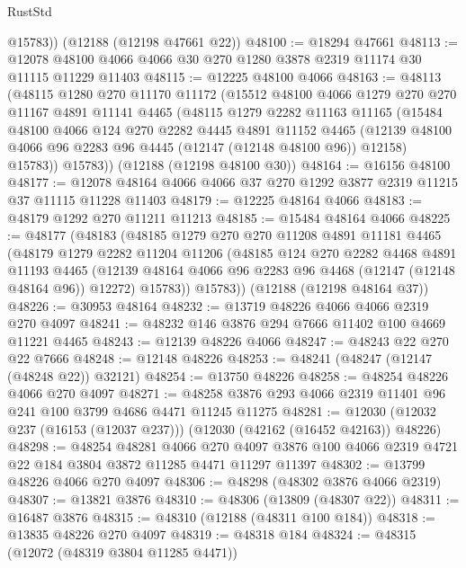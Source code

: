 \begin{lexlean}{RustStd}
\begin{coremodule}
        @15783))
    (@12188 (@12198 @47661 @22))
@48100 := @18294 @47661
@48113 := @12078 @48100 @4066 @4066 @30 @270 @1280 @3878 @2319 @11174 @30 @11115 @11229 @11403
@48115 := @12225 @48100 @4066
@48163 := @48113
    (@48115
      @1280
      @270
      @11170
      @11172
      (@15512
        @48100
        @4066
        @1279
        @270
        @270
        @11167
        @4891
        @11141
        @4465
        (@48115
          @1279
          @2282
          @11163
          @11165
          (@15484
            @48100
            @4066
            @124
            @270
            @2282
            @4445
            @4891
            @11152
            @4465
            (@12139 @48100 @4066 @96 @2283 @96 @4445 (@12147 (@12148 @48100 @96)) @12158)
            @15783))
        @15783))
    (@12188 (@12198 @48100 @30))
@48164 := @16156 @48100
@48177 := @12078 @48164 @4066 @4066 @37 @270 @1292 @3877 @2319 @11215 @37 @11115 @11228 @11403
@48179 := @12225 @48164 @4066
@48183 := @48179 @1292 @270 @11211 @11213
@48185 := @15484 @48164 @4066
@48225 := @48177
    (@48183
      (@48185
        @1279
        @270
        @270
        @11208
        @4891
        @11181
        @4465
        (@48179
          @1279
          @2282
          @11204
          @11206
          (@48185
            @124
            @270
            @2282
            @4468
            @4891
            @11193
            @4465
            (@12139 @48164 @4066 @96 @2283 @96 @4468 (@12147 (@12148 @48164 @96)) @12272)
            @15783))
        @15783))
    (@12188 (@12198 @48164 @37))
@48226 := @30953 @48164
@48232 := @13719 @48226 @4066 @4066 @2319 @270 @4097
@48241 := @48232 @146 @3876 @294 @7666 @11402 @100 @4669 @11221 @4465
@48243 := @12139 @48226 @4066
@48247 := @48243 @22 @270 @22 @7666
@48248 := @12148 @48226
@48253 := @48241 (@48247 (@12147 (@48248 @22)) @32121)
@48254 := @13750 @48226
@48258 := @48254 @48226 @4066 @270 @4097
@48271 := @48258 @3876 @293 @4066 @2319 @11401 @96 @241 @100 @3799 @4686 @4471 @11245 @11275
@48281 := @12030 (@12032 @237 (@16153 (@12037 @237))) (@12030 (@42162 (@16452 @42163)) @48226)
@48298 := @48254
    @48281
    @4066
    @270
    @4097
    @3876
    @100
    @4066
    @2319
    @4721
    @22
    @184
    @3804
    @3872
    @11285
    @4471
    @11297
    @11397
@48302 := @13799 @48226 @4066 @270 @4097
@48306 := @48298 (@48302 @3876 @4066 @2319)
@48307 := @13821 @3876
@48310 := @48306 (@13809 (@48307 @22))
@48311 := @16487 @3876
@48315 := @48310 (@12188 (@48311 @100 @184))
@48318 := @13835 @48226 @270 @4097
@48319 := @48318 @184
@48324 := @48315 (@12072 (@48319 @3804 @11285 @4471))

\end{coremodule}
\end{lexlean}
